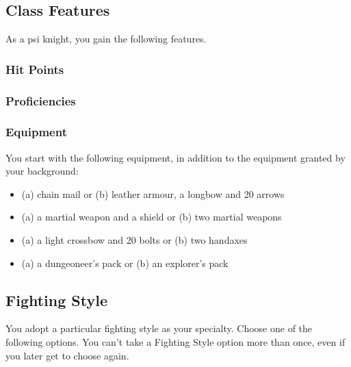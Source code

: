 \subsection{Class Features}
As a psi knight, you gain the following features.

\subsubsection{Hit Points}


\subsubsection{Proficiencies}

\vspace{6pt}

\subsubsection{Equipment}
You start with the following equipment,
in addition to the equipment granted by your background:
\begin{itemize}
    \item (a) chain mail or
          (b) leather armour, a longbow
            and 20 arrows
    \item (a) a martial weapon and a shield or
          (b) two martial weapons
    \item (a) a light crossbow and 20 bolts or
          (b) two handaxes
    \item (a) a dungeoneer's pack or
          (b) an explorer's pack
\end{itemize}

\subsection{Fighting Style}
You adopt a particular fighting style as your specialty.
Choose one of the following options.
You can't take a Fighting Style option more than once,
even if you later get to choose again.

